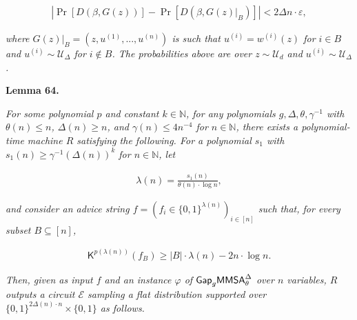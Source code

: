 \[\begin{gathered}
\left|\Pr\left[D(\beta,G(z))\right]-\Pr\left[D(\beta,G(z)|_{B})\right]\right|<2\Delta n\cdot\varepsilon,
\end{gathered}\]


\emph{where $G(z)|_{B}=(z,u^{(1)},...,u^{(n)})$ is such that $u^{(i)}=w^{(i)}(z)$ for $i\in B$ and $u^{(i)}\sim\mathcal{U}_{\Delta}$ for $i\notin B$. The probabilities above are over $z\sim\mathcal{U}_{d}$ and $u^{(i)}\sim\mathcal{U}_{\Delta}$.}\par







\par\medskip\noindent\textbf{
\textbf{Lemma 64}\textbf{.}
}\par



\emph{For some polynomial $p$ and constant $k\in\mathbb{N}$, for any polynomials $g,\Delta,\theta,\gamma^{-1}$ with $\theta(n)\leq n$, $\Delta(n)\geq n$, and $\gamma(n)\leq 4n^{-4}$ for $n\in\mathbb{N}$, there exists a polynomial-time machine $R$ satisfying the following. For a polynomial $s_{1}$ with $s_{1}(n)\geq\gamma^{-1}(\Delta(n))^{k}$ for $n\in\mathbb{N}$, let}\par


\[\begin{gathered}
\lambda(n)=\frac{s_{1}(n)}{\theta(n)\cdot\log n},
\end{gathered}\]


\emph{and consider an advice string $f=(f_{i}\in\{0,1\}^{\lambda(n)})_{i\in[n]}$ such that, for every subset $B\subseteq[n]$,}\par


\[\begin{gathered}
{\mathsf{K}}^{p(\lambda(n))}(f_{B})\geq|B|\cdot\lambda(n)-2n\cdot\log n.
\end{gathered}\]


\emph{Then, given as input $f$ and an instance $\varphi$ of ${\sf Gap}_{g}{\mathsf{MMSA}}^{\Delta}_{\theta}$ over $n$ variables, $R$ outputs a circuit $\mathcal{E}$ sampling a flat distribution supported over $\{0,1\}^{2\Delta(n)\cdot n}\times\{0,1\}$ as follows.}\par


